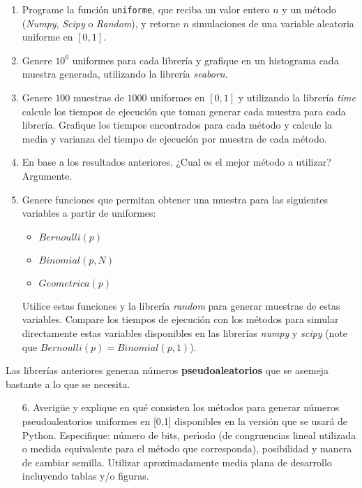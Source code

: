 \begin{enumerate}
    \item Programe la función \texttt{uniforme}, que reciba un valor entero $n$ y un método (\textit{Numpy}, \textit{Scipy} o \textit{Random}), y retorne $n$ simulaciones de una variable aleatoria uniforme en $[0,1]$.
    \item Genere $10^6$ uniformes para cada librería y grafique en un histograma cada muestra generada, utilizando la librería \textit{seaborn}.
    \item Genere $100$ muestras de $1000$ uniformes en $[0,1]$ y utilizando la librería \textit{time} calcule los tiempos de ejecución que toman generar cada muestra para cada librería. Grafique los tiempos encontrados para cada método y calcule la media y varianza del tiempo de ejecución por muestra de cada método.
    \item En base a los resultados anteriores. ¿Cual es el mejor método a utilizar? Argumente.
    \item Genere funciones que permitan obtener una muestra para las siguientes variables a partir de uniformes:
    \begin{itemize}
        \item $Bernoulli(p)$
        \item $Binomial(p,N)$
        \item $Geometrica(p)$
    \end{itemize}
    Utilice estas funciones y la librería \textit{random} para generar muestras de estas variables. Compare los tiempos de ejecución con los métodos para simular directamente estas variables disponibles en las librerías \textit{numpy} y \textit{scipy} (note que $Bernoulli(p)=Binomial(p,1)$).
\end{enumerate}
Las librerías anteriores generan números \textbf{pseudoaleatorios} que se asemeja bastante a lo que se necesita.

\begin{enumerate}
    \item[6.] Averig\"{u}e y explique en qu\'{e} consisten los m\'{e}todos para generar n\'{u}meros pseudoaleatorios uniformes en [0,1] disponibles en la versi\'{o}n que se usar\'{a} de Python. Especifique: n\'{u}mero de bits, per\'{\i}odo (de congruencias lineal utilizada o medida equivalente para el m\'{e}todo que corresponda), posibilidad y manera de cambiar semilla. Utilizar aproximadamente media plana de desarrollo incluyendo tablas y/o figuras.

\end{enumerate}
